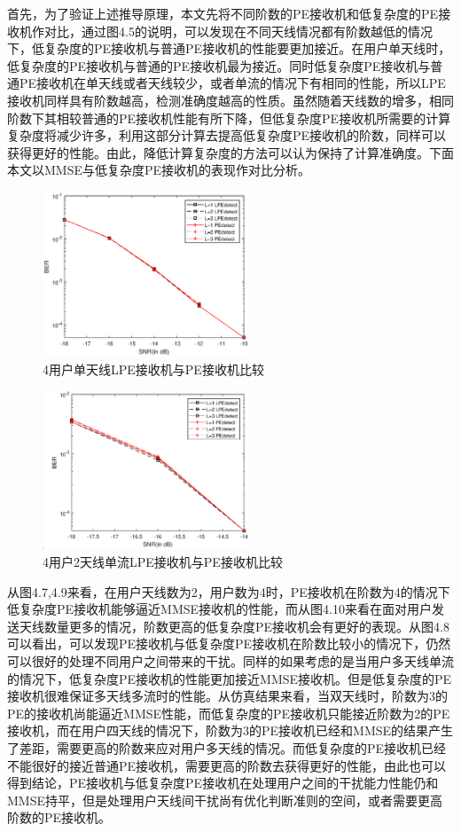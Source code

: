 \documentclass[bachelor,nocolorlinks, printoneside]{seuthesis} %
\begin{document}
\begin{Main}
首先，为了验证上述推导原理，本文先将不同阶数的PE接收机和低复杂度的PE接收机作对比，通过图4.5的说明，可以发现在不同天线情况都有阶数越低的情况下，低复杂度的PE接收机与普通PE接收机的性能要更加接近。在用户单天线时，低复杂度的PE接收机与普通的PE接收机最为接近。同时低复杂度PE接收机与普通PE接收机在单天线或者天线较少，或者单流的情况下有相同的性能，所以LPE接收机同样具有阶数越高，检测准确度越高的性质。虽然随着天线数的增多，相同阶数下其相较普通的PE接收机性能有所下降，但低复杂度PE接收机所需要的计算复杂度将减少许多，利用这部分计算去提高低复杂度PE接收机的阶数，同样可以获得更好的性能。由此，降低计算复杂度的方法可以认为保持了计算准确度。下面本文以MMSE与低复杂度PE接收机的表现作对比分析。
\begin{figure}[htbp!]
	\centering \includegraphics[width=0.55\textwidth]{img/4_5.eps} \caption{4用户单天线LPE接收机与PE接收机比较}
\end{figure}
\begin{figure}[htbp!]
	\centering \includegraphics[width=0.55\textwidth]{img/4_6.eps} \caption{4用户2天线单流LPE接收机与PE接收机比较}
\end{figure}

从图4.7,4.9来看，在用户天线数为2，用户数为4时，PE接收机在阶数为4的情况下低复杂度PE接收机能够逼近MMSE接收机的性能，而从图4.10来看在面对用户发送天线数量更多的情况，阶数更高的低复杂度PE接收机会有更好的表现。从图4.8可以看出，可以发现PE接收机与低复杂度PE接收机在阶数比较小的情况下，仍然可以很好的处理不同用户之间带来的干扰。同样的如果考虑的是当用户多天线单流的情况下，低复杂度PE接收机的性能更加接近MMSE接收机。但是低复杂度的PE接收机很难保证多天线多流时的性能。从仿真结果来看，当双天线时，阶数为3的PE的接收机尚能逼近MMSE性能，而低复杂度的PE接收机只能接近阶数为2的PE接收机，而在用户四天线的情况下，阶数为3的PE接收机已经和MMSE的结果产生了差距，需要更高的阶数来应对用户多天线的情况。而低复杂度的PE接收机已经不能很好的接近普通PE接收机，需要更高的阶数去获得更好的性能，由此也可以得到结论，PE接收机与低复杂度PE接收机在处理用户之间的干扰能力性能仍和MMSE持平，但是处理用户天线间干扰尚有优化判断准则的空间，或者需要更高阶数的PE接收机。


\end{Main}
\end{document}
